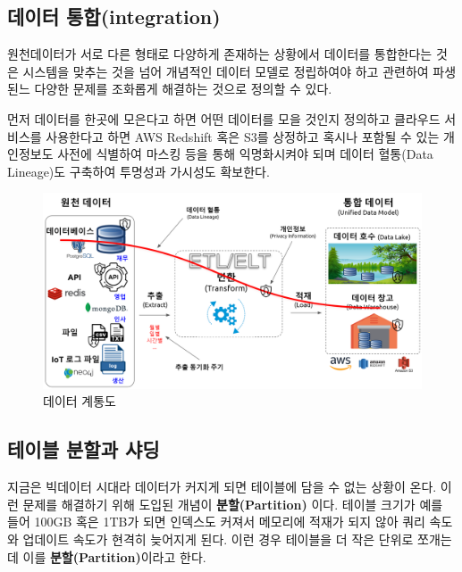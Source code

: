 \documentclass[
  letterpaper,
  chapter,a4paper,showtrims,openright,hidelinks]{oblivoir}
\begin{document}
\hypertarget{database-integration}{%
\subsection{데이터 통합(integration)}\label{database-integration}}

원천데이터가 서로 다른 형태로 다양하게 존재하는 상황에서 데이터를
통합한다는 것은 시스템을 맞추는 것을 넘어 개념적인 데이터 모델로
정립하여야 하고 관련하여 파생된느 다양한 문제를 조화롭게 해결하는 것으로
정의할 수 있다.

먼저 데이터를 한곳에 모은다고 하면 어떤 데이터를 모을 것인지 정의하고
클라우드 서비스를 사용한다고 하면 AWS Redshift 혹은 S3를 상정하고 혹시나
포함될 수 있는 개인정보도 사전에 식별하여 마스킹 등을 통해 익명화시켜야
되며 데이터 혈통(Data Lineage)도 구축하여 투명성과 가시성도 확보한다.

\begin{figure}

{\centering \includegraphics{images/database_lineage.png}

}

\caption{데이터 계통도}

\end{figure}

\hypertarget{table-partition}{%
\subsection{테이블 분할과 샤딩}\label{table-partition}}

지금은 빅데이터 시대라 데이터가 커지게 되면 테이블에 담을 수 없는 상황이
온다. 이런 문제를 해결하기 위해 도입된 개념이 \textbf{분할(Partition)}
이다. 테이블 크기가 예를 들어 100GB 혹은 1TB가 되면 인덱스도 커져서
메모리에 적재가 되지 않아 쿼리 속도와 업데이트 속도가 현격히 늦어지게
된다. 이런 경우 테이블을 더 작은 단위로 쪼개는데 이를
\textbf{분할(Partition)}이라고 한다.
\end{document}
